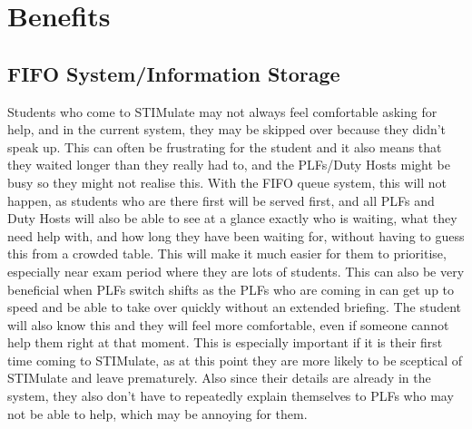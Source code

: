 \documentclass{article}
\begin{document}
	\section{Benefits}
	\subsection{FIFO System/Information Storage}
Students who come to STIMulate may not always feel comfortable asking for help, and in the current system, they may be skipped over because they didn't speak up. This can often be frustrating for the student and it also means that they waited longer than they really had to, and the PLFs/Duty Hosts might be busy so they might not realise this. 
	\newline
	\newline
With the FIFO queue system, this will not happen, as students who are there first will be served first, and all PLFs and Duty Hosts will also be able to see at a glance exactly who is waiting, what they need help with, and how long they have been waiting for, without having to guess this from a crowded table. This will make it much easier for them to prioritise, especially near exam period where they are lots of students. 
	\newline
	\newline
This can also be very beneficial when PLFs switch shifts as the PLFs who are coming in can get up to speed and be able to take over quickly without an extended briefing. 
	\newline
	\newline
The student will also know this and they will feel more comfortable, even if someone cannot help them right at that moment. This is especially important if it is their first time coming to STIMulate, as at this point they are more likely to be sceptical of STIMulate and leave prematurely. Also since their details are already in the system, they also don’t have to repeatedly explain themselves to PLFs who may not be able to help, which may be annoying for them. 
\end{document}
